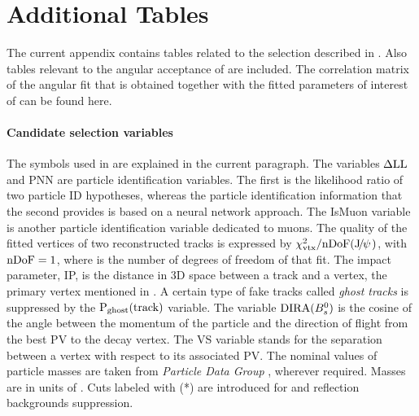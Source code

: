
\chapter{Additional Tables}
\label{AdditionalTables}

The current appendix contains tables related to the selection described in .
Also tables relevant to the angular acceptance of  are included.
The correlation matrix of the angular fit that is obtained together with the fitted parameters
of interest of  can be found here.

\subsubsection{Candidate selection variables}
The symbols used in  are explained in the current paragraph.
The variables $\rm \Delta LL$ and PNN are particle identification variables. The first is the
likelihood ratio of two particle ID hypotheses, whereas the particle identification information
that the second provides is based on a neural network approach. The IsMuon variable is another
particle identification variable dedicated to muons. The quality of the fitted vertices
of two reconstructed tracks is expressed by $\chi^2_{\rm vtx}/\rm nDoF({J\mskip -3mu/\mskip -2mu\psi\mskip 2mu})$, with $\rm nDoF=1$, where \nDoF
is the number of degrees of freedom of that fit. The impact parameter, IP, is the distance in
3D space between a track and a vertex, \eg the primary vertex mentioned in .
A certain type of fake tracks called {\it ghost tracks} is suppressed by the $\text{P}_{\rm ghost}(\rm track)$
variable. The variable ${\rm DIRA}(B^0_s)$ is the cosine of the angle between the momentum of the \Bs particle
and the direction of flight from the best PV to the \Bs decay vertex. The VS variable stands for
the separation between a vertex with respect to its associated PV. The nominal values of particle
masses are taken from {\it Particle Data Group} \cite{PDG}, wherever required. Masses are in units
of \mevcc. Cuts labeled with (*) are introduced for \LbJpsipK and \LbJpsippi reflection backgrounds suppression.


